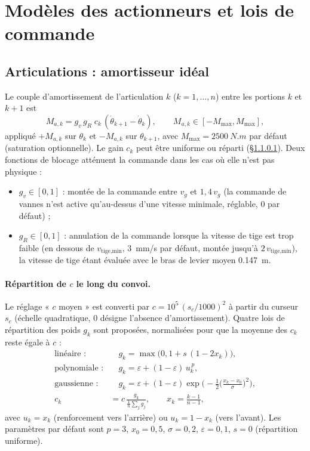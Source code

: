 \documentclass[11pt,a4paper]{article}
\newcommand{\dt}[1]{\dot{#1}}
\begin{document}
\section{Modèles des actionneurs et lois de commande}
\subsection{Articulations : amortisseur idéal}\label{sec:art}
Le couple d'amortissement de l'articulation $k$ ($k=1,\dots,n$) entre les portions $k$ et $k+1$ est
\begin{equation}
 M_{a,k}=g_v\,g_R\;c_k\,(\dt\theta_{k+1}-\dt\theta_k),\qquad M_{a,k}\in[-M_{\max},M_{\max}],
\end{equation}
appliqué $+M_{a,k}$ sur $\theta_k$ et $-M_{a,k}$ sur $\theta_{k+1}$, avec $M_{\max}=\SI{2500}{N.m}$ par défaut (saturation optionnelle). Le gain $c_k$ peut être uniforme ou réparti (§\ref{sec:repart}). Deux fonctions de blocage atténuent la commande dans les cas où elle n'est pas physique :
\begin{itemize}
 \item $g_v\in[0,1]$ : montée de la commande entre $v_g$ et $1{,}4\,v_g$ (la commande de vannes n'est active qu'au-dessus d'une vitesse minimale, réglable, $0$ par défaut) ;
 \item $g_R\in[0,1]$ : annulation de la commande lorsque la vitesse de tige est trop faible (en dessous de $v_{\text{tige,min}}$, \SI{3}{mm/s} par défaut, montée jusqu'à $2\,v_{\text{tige,min}}$), la vitesse de tige étant évaluée avec le bras de levier moyen \SI{0,147}{m}.
\end{itemize}

\paragraph{Répartition de $c$ le long du convoi.}\label{sec:repart}
Le réglage « $c$ moyen » est converti par $c=10^5\,(s_c/1000)^2$ à partir du curseur $s_c$ (échelle quadratique, $0$ désigne l'absence d'amortissement). Quatre lois de répartition des poids $g_k$ sont proposées, normalisées pour que la moyenne des $c_k$ reste égale à $c$ :
\begin{align}
 \text{linéaire :}&\quad g_k=\max\big(0,1+s\,(1-2x_k)\big),\\
 \text{polynomiale :}&\quad g_k=\varepsilon+(1-\varepsilon)\,u_k^{\,p},\\
 \text{gaussienne :}&\quad g_k=\varepsilon+(1-\varepsilon)\exp\!\Big(-\tfrac12\Big(\tfrac{x_k-x_0}{\sigma}\Big)^2\Big),\\
 c_k&=c\,\frac{g_k}{\frac1n\sum_j g_j},\qquad x_k=\tfrac{k-1}{n-1},
\end{align}
avec $u_k=x_k$ (renforcement vers l'arrière) ou $u_k=1-x_k$ (vers l'avant). Les paramètres par défaut sont $p=3$, $x_0=0{,}5$, $\sigma=0{,}2$, $\varepsilon=0{,}1$, $s=0$ (répartition uniforme).
\end{document}
